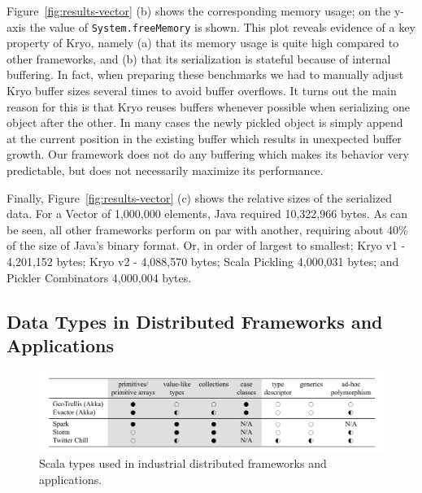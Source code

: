 \documentclass[preprint,10pt]{sigplanconf}
\theoremstyle{definition}
\theoremstyle{definition}
\begin{document}
Figure~\ref{fig:results-vector} (b) shows the corresponding memory usage; on the
y-axis the value of \texttt{System.freeMemory} is shown. This plot
reveals evidence of a key property of Kryo, namely (a) that its memory usage
is quite high compared to other frameworks, and (b) that its
serialization is stateful because of internal buffering. In fact, when
preparing these benchmarks we had to manually adjust Kryo buffer sizes
several times to avoid buffer overflows. It turns out the main reason
for this is that Kryo reuses buffers whenever possible when
serializing one object after the other. In many cases the
newly pickled object is simply append at the current position in the
existing buffer which results in unexpected buffer growth. Our
framework does not do any buffering which makes its behavior very
predictable, but does not necessarily maximize its performance.

Finally, Figure~\ref{fig:results-vector} (c) shows the relative sizes of the serialized data. For a Vector of 1,000,000 elements, Java required 10,322,966 bytes. As can be seen, all other frameworks perform on par with another, requiring about 40\% of the size of Java's binary format. Or, in order of largest to smallest; Kryo v1 - 4,201,152 bytes; Kryo v2 - 4,088,570 bytes; Scala Pickling 4,000,031 bytes; and Pickler Combinators 4,000,004 bytes.

\subsection{Data Types in Distributed Frameworks and Applications}

\begin{figure}[ht!]
 \centering
 \includegraphics{application-table.pdf}
 \caption{Scala types used in industrial distributed frameworks and applications.}
 \label{fig:application-table}
\end{figure}
\end{document}
